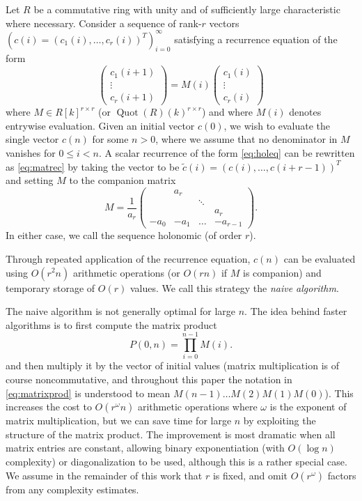 \documentclass{sig-alternate}
\begin{document}
Let $R$ be a commutative ring with unity and of sufficiently
large characteristic where necessary. 
Consider a sequence of rank-$r$ vectors $(c(i) = (c_1(i), \ldots, c_r(i))^T)_{i=0}^{\infty}$
satisfying a recurrence equation of the form
\begin{equation}
\begin{pmatrix}
c_1(i+1) \\ \vdots \\ c_r(i+1)
\end{pmatrix}
= M(i)
\begin{pmatrix}
c_1(i) \\ \vdots \\ c_r(i)
\end{pmatrix}
\label{eq:matrec}
\end{equation}
where $M \in R[k]^{r \times r}$ (or $\operatorname{Quot}(R)(k)^{r \times r}$)
and where $M(i)$ denotes entrywise
evaluation. Given an initial vector $c(0)$, we wish to evaluate
the single vector $c(n)$ for some $n > 0$, where we assume that no
denominator in $M$ vanishes for $0 \le i < n$.
A scalar recurrence of the form \eqref{eq:holeq}
can be rewritten as \eqref{eq:matrec} by taking the vector
to be $\tilde c(i) = (c(i), \ldots, c(i+r-1))^T$ and setting $M$
to the companion matrix
\begin{equation}
M = \frac{1}{a_r}
\begin{pmatrix}
       &      a_r &   &   \\
       &    & \ddots &    \\
       &      &         & a_r \\
-a_0   & -a_1 & \ldots & -a_{r-1}
\end{pmatrix}.
\label{eq:companion}
\end{equation}
In either case, we call the sequence holonomic (of order $r$).

Through repeated application of the recurrence equation,
$c(n)$ can be evaluated using $O(r^2 n)$ arithmetic operations
(or $O(r n)$ if $M$ is companion) and temporary storage of $O(r)$ values.
We call this strategy the \emph{naive algorithm}.

The naive algorithm is not generally
optimal for large $n$. The idea
behind faster algorithms is to first compute the matrix product
\begin{equation}
P(0,n) = \prod_{i=0}^{n-1} M(i).
\label{eq:matrixprod}
\end{equation}
and then multiply it by the vector of initial values
(matrix multiplication is of course noncommutative,
and throughout this paper the notation in \eqref{eq:matrixprod} is understood to mean
$M(n-1) \ldots M(2) M(1) M(0)$).
This increases the cost to $O(r^{\omega} n)$
arithmetic operations where $\omega$ is the exponent of matrix
multiplication, but we can save time for large $n$ by
exploiting the structure of the matrix product.
The improvement is most dramatic when all matrix entries are constant,
allowing binary exponentiation (with $O(\log n)$ complexity)
or diagonalization to be used,
although this is a rather special case.
We assume in the
remainder of this work that $r$ is fixed,
and omit $O(r^{\omega})$ factors from
any complexity estimates.
\end{document}
